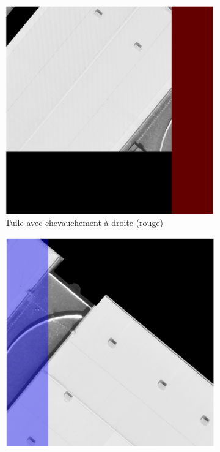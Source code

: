\begin{figure}[H]
    \centering
    \begin{subfigure}[b]{0.49\textwidth}
        \centering
        \includegraphics[width=\textwidth]{02-main/figures/ch3/ch3_postprocessing_dataset_08_validation_chevauchement_droite1.png}
        \caption{Tuile avec chevauchement à droite (rouge)}
        \label{fig:ch3_postprocessing_dataset_08_validation_chevauchement_droite1}
    \end{subfigure}
    \hfill
    \begin{subfigure}[b]{0.49\textwidth}
        \centering
        \includegraphics[width=\textwidth]{02-main/figures/ch3/ch3_postprocessing_dataset_09_validation_chevauchement_droite2.png}

\end{subfigure}
\end{figure}
